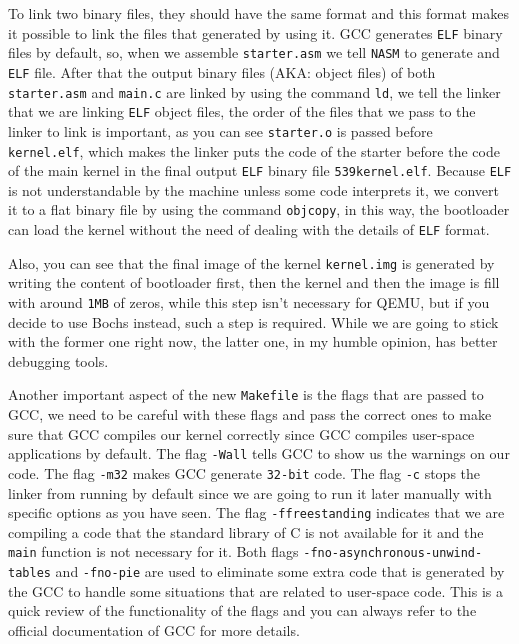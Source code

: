 To link two binary files, they should have the same format and this
format makes it possible to link the files that generated by using it.
GCC generates \lstinline!ELF! binary files by default, so, when we
assemble \lstinline!starter.asm! we tell \lstinline!NASM! to generate
and \lstinline!ELF! file. After that the output binary files (AKA:
object files) of both \lstinline!starter.asm! and \lstinline!main.c! are
linked by using the command \lstinline!ld!, we tell the linker that we
are linking \lstinline!ELF! object files, the order of the files that we
pass to the linker to link is important, as you can see
\lstinline!starter.o! is passed before \lstinline!kernel.elf!, which
makes the linker puts the code of the starter before the code of the
main kernel in the final output \lstinline!ELF! binary file
\lstinline!539kernel.elf!. Because \lstinline!ELF! is not understandable
by the machine unless some code interprets it, we convert it to a flat
binary file by using the command \lstinline!objcopy!, in this way, the
bootloader can load the kernel without the need of dealing with the
details of \lstinline!ELF! format.

Also, you can see that the final image of the kernel
\lstinline!kernel.img! is generated by writing the content of bootloader
first, then the kernel and then the image is fill with around
\lstinline!1MB! of zeros, while this step isn't necessary for QEMU, but
if you decide to use Bochs instead, such a step is required. While we
are going to stick with the former one right now, the latter one, in my
humble opinion, has better debugging tools.

Another important aspect of the new \lstinline!Makefile! is the flags
that are passed to GCC, we need to be careful with these flags and pass
the correct ones to make sure that GCC compiles our kernel correctly
since GCC compiles user-space applications by default. The flag
\lstinline!-Wall! tells GCC to show us the warnings on our code. The
flag \lstinline!-m32! makes GCC generate \lstinline!32-bit! code. The
flag \lstinline!-c! stops the linker from running by default since we
are going to run it later manually with specific options as you have
seen. The flag \lstinline!-ffreestanding! indicates that we are
compiling a code that the standard library of C is not available for it
and the \lstinline!main! function is not necessary for it. Both flags
\lstinline!-fno-asynchronous-unwind-tables! and \lstinline!-fno-pie! are
used to eliminate some extra code that is generated by the GCC to handle
some situations that are related to user-space code. This is a quick
review of the functionality of the flags and you can always refer to the
official documentation of GCC for more details.

